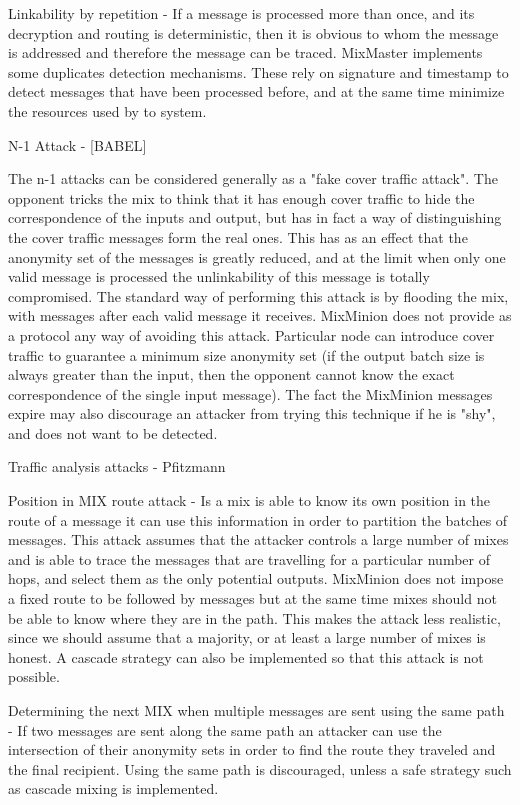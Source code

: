 Linkability by repetition - If a message is processed more than once,
and its decryption and routing is deterministic, then it is obvious to
whom the message is addressed and therefore the message can be
traced. MixMaster implements some duplicates detection
mechanisms. These rely on signature and timestamp to
detect messages that have been processed before, and at the same time
minimize the resources used by to system.

N-1 Attack - [BABEL]

The n-1 attacks can be considered generally as a "fake cover traffic
attack". The opponent tricks the mix to think that it has enough cover
traffic to hide the correspondence of the inputs and output, but has
in fact a way of distinguishing the cover traffic messages form the
real ones. This has as an effect that the anonymity set of the
messages is greatly reduced, and at the limit when only one valid
message is processed the unlinkability of this message is totally
compromised. The standard way of performing this attack is by flooding
the mix, with messages after each valid message it receives. MixMinion
does not provide as a protocol any way of avoiding this
attack. Particular node can introduce cover
traffic to guarantee a minimum size anonymity set (if the output batch
size is always greater than the input, then the opponent cannot know
the exact correspondence of the single input message). The fact the
MixMinion messages expire may also discourage an attacker from trying
this technique if he is "shy", and does not want to be detected.

Traffic analysis attacks - Pfitzmann

Position in MIX route attack - Is a mix is able to know its own
position in the route of a message it can use this information in
order to partition the batches of messages. This attack assumes that
the attacker controls a large number of mixes and is able to trace the
messages that are travelling for a particular number of hops, and select
them as the only potential outputs. MixMinion does not impose a fixed
route to be followed by messages but at the same time mixes should not
be able to know where they are in the path. This makes the attack less
realistic, since we should assume that a majority, or at least a large
number of mixes is honest. A cascade strategy can also be implemented
so that this attack is not possible.

Determining the next MIX when multiple messages are sent using the
same path - If two messages are sent along the same path an attacker
can use the intersection of their anonymity sets in order to find the
route they traveled and the final recipient. Using the same path is
discouraged, unless a safe strategy such as cascade mixing is
implemented. 

